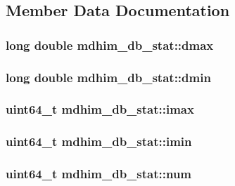 \subsection{Member Data Documentation}
\hypertarget{structmdhim__db__stat_a1ccd0e75db4b05ea4ef48b2e36c757f5}{
\subsubsection[{dmax}]{\setlength{\rightskip}{0pt plus 5cm}long double mdhim\-\_\-db\-\_\-stat\-::dmax}}\label{db/d64/structmdhim__db__stat_a1ccd0e75db4b05ea4ef48b2e36c757f5}
\hypertarget{structmdhim__db__stat_ac1f4a8cb1a2a1c567245bc5b8ecfdc05}{
\subsubsection[{dmin}]{\setlength{\rightskip}{0pt plus 5cm}long double mdhim\-\_\-db\-\_\-stat\-::dmin}}\label{db/d64/structmdhim__db__stat_ac1f4a8cb1a2a1c567245bc5b8ecfdc05}
\hypertarget{structmdhim__db__stat_a58ff0fbdb99c6f23d7cb8945c2f9b6e0}{
\subsubsection[{imax}]{\setlength{\rightskip}{0pt plus 5cm}uint64\-\_\-t mdhim\-\_\-db\-\_\-stat\-::imax}}\label{db/d64/structmdhim__db__stat_a58ff0fbdb99c6f23d7cb8945c2f9b6e0}
\hypertarget{structmdhim__db__stat_a76f68ccd3a2fabdd949512ab7bcacd5d}{
\subsubsection[{imin}]{\setlength{\rightskip}{0pt plus 5cm}uint64\-\_\-t mdhim\-\_\-db\-\_\-stat\-::imin}}\label{db/d64/structmdhim__db__stat_a76f68ccd3a2fabdd949512ab7bcacd5d}
\hypertarget{structmdhim__db__stat_a362426563ec5fbc354dfdbf31e68d691}{
\subsubsection[{num}]{\setlength{\rightskip}{0pt plus 5cm}uint64\-\_\-t mdhim\-\_\-db\-\_\-stat\-::num}}\label{db/d64/structmdhim__db__stat_a362426563ec5fbc354dfdbf31e68d691}
